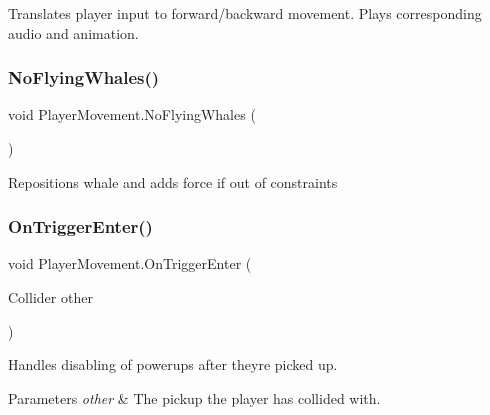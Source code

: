 Translates player input to forward/backward movement. Plays corresponding audio and animation. 

\mbox{\label{class_player_movement_a49aa6a80bb76113ff3702536ea1b46de}} 
\subsubsection{\texorpdfstring{No\+Flying\+Whales()}{NoFlyingWhales()}}
{\footnotesize\ttfamily void Player\+Movement.\+No\+Flying\+Whales (\begin{DoxyParamCaption}{ }\end{DoxyParamCaption})\hspace{0.3cm}{\ttfamily [private]}}



Repositions whale and adds force if out of constraints 

\mbox{\label{class_player_movement_a0d2a1162c4cc3a5d4be939d00368c6e3}} 
\subsubsection{\texorpdfstring{On\+Trigger\+Enter()}{OnTriggerEnter()}}
{\footnotesize\ttfamily void Player\+Movement.\+On\+Trigger\+Enter (\begin{DoxyParamCaption}\item[{Collider}]{other }\end{DoxyParamCaption})\hspace{0.3cm}{\ttfamily [private]}}



Handles disabling of powerups after they\textquotesingle{}re picked up. 
\begin{DoxyParams}{Parameters}
{\em other} & The pickup the player has collided with.\\
\hline
\end{DoxyParams}


\mbox{\label{class_player_movement_a0f28741d3452090520ee11352140aed0}} 

